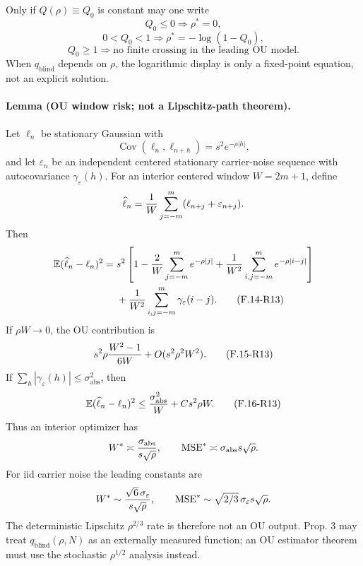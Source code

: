 Only if $Q(\rho)\equiv Q_0$ is constant may one write
\[
 Q_0\le0\Rightarrow\rho^*=0,
\]
\[
 0<Q_0<1\Rightarrow\rho^*=-\log(1-Q_0),
\]
\[
 Q_0\ge1\Rightarrow\text{no finite crossing in the leading OU model}.
\]
When $q_{\mathrm{blind}}$ depends on $\rho$, the logarithmic display is
only a fixed-point equation, not an explicit solution.

\paragraph{Lemma (OU window risk; not a Lipschitz-path theorem).}
Let $\ell_n$ be stationary Gaussian with
\[
 \operatorname{Cov}(\ell_n,\ell_{n+h})=s^2e^{-\rho|h|},
\]
and let $\varepsilon_n$ be an independent centered stationary
carrier-noise sequence with autocovariance $\gamma_\varepsilon(h)$.
For an interior centered window $W=2m+1$, define
\[
 \widehat\ell_n={1\over W}\sum_{j=-m}^m
 (\ell_{n+j}+\varepsilon_{n+j}).
\]
Then
\begin{align}
 \mathbb E(\widehat\ell_n-\ell_n)^2
 ={}&s^2\left[1-{2\over W}\sum_{j=-m}^me^{-\rho|j|}
 +{1\over W^2}\sum_{i,j=-m}^me^{-\rho|i-j|}\right]\notag\\
 &+{1\over W^2}\sum_{i,j=-m}^m\gamma_\varepsilon(i-j).
 \tag{F.14-R13}
\end{align}
If $\rho W\to0$, the OU contribution is
\begin{equation}
 s^2\rho{W^2-1\over6W}+O(s^2\rho^2W^2). \tag{F.15-R13}
\end{equation}
If $\sum_h|\gamma_\varepsilon(h)|\le\sigma_{\mathrm{abs}}^2$, then
\begin{equation}
 \mathbb E(\widehat\ell_n-\ell_n)^2
 \le {\sigma_{\mathrm{abs}}^2\over W}+Cs^2\rho W. \tag{F.16-R13}
\end{equation}
Thus an interior optimizer has
\[
 W^*\asymp{\sigma_{\mathrm{abs}}\over s\sqrt\rho},
 \qquad
 \mathrm{MSE}^*\asymp\sigma_{\mathrm{abs}}s\sqrt\rho.
\]
For iid carrier noise the leading constants are
\[
 W^*\sim{\sqrt6\,\sigma_\varepsilon\over s\sqrt\rho},
 \qquad
 \mathrm{MSE}^*\sim\sqrt{2/3}\,\sigma_\varepsilon s\sqrt\rho.
\]
The deterministic Lipschitz $\rho^{2/3}$ rate is therefore not an OU
output.  Prop. 3 may treat $q_{\mathrm{blind}}(\rho,N)$ as an externally
measured function; an OU estimator theorem must use the stochastic
$\rho^{1/2}$ analysis instead.

